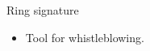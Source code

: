 \documentclass[usenames,dvipsnames]{beamer}
\begin{document}
\begin{frame}{Ring signature}
\begin{itemize}
            \item Tool for whistleblowing.
        \end{itemize}
    \end{frame}
\end{document}
